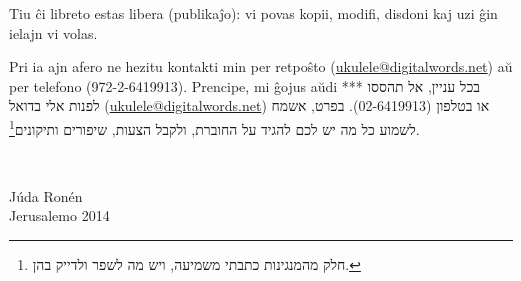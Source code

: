 Tiu ĉi libreto estas libera (publikaĵo): vi povas kopii, modifi, disdoni kaj uzi ĝin ielajn vi volas.

Pri ia ajn afero ne hezitu kontakti min per retpoŝto (\url{ukulele@digitalwords.net}) aŭ per telefono (972-2-6419913). Prencipe, mi ĝojus aŭdi ***
בכל עניין, אל תהססו לפנות אלי בדואל (\url{ukulele@digitalwords.net}) או בטלפון (02-6419913). בפרט, אשמח לשמוע כל מה יש לכם להגיד על החוברת, ולקבל הצעות, שיפורים ותיקונים\footnote{חלק מהמנגינות כתבתי משמיעה, ויש מה לשפר ולדייק בהן.}.

\vspace{\baselineskip}
~\hfill
\begin{minipage}{3cm}
	Júda Ronén\\
	Jerusalemo 2014\\
\end{minipage}
